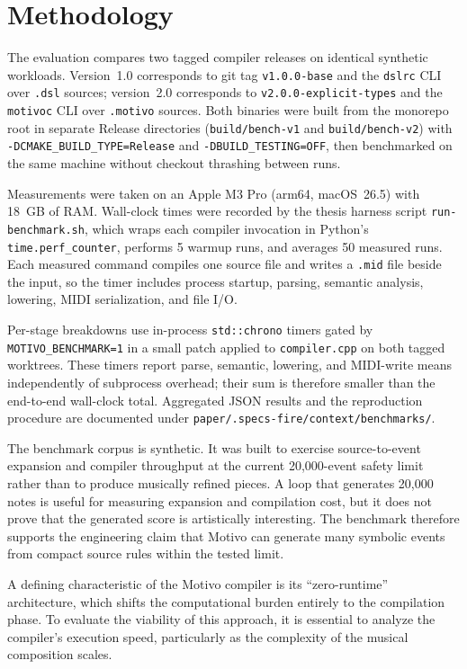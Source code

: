\section{Methodology}\label{sec:evaluation-methodology}

The evaluation compares two tagged compiler releases on identical synthetic workloads.
Version~1.0 corresponds to git tag \texttt{v1.0.0-base} and the \texttt{dslrc} CLI over \texttt{.dsl} sources;
version~2.0 corresponds to \texttt{v2.0.0-explicit-types} and the \texttt{motivoc} CLI over \texttt{.motivo} sources.
Both binaries were built from the monorepo root in separate Release directories
(\texttt{build/bench-v1} and \texttt{build/bench-v2}) with \texttt{-DCMAKE\_BUILD\_TYPE=Release} and
\texttt{-DBUILD\_TESTING=OFF}, then benchmarked on the same machine without checkout thrashing between runs.

Measurements were taken on an Apple M3 Pro (arm64, macOS~26.5) with 18~GB of RAM.
Wall-clock times were recorded by the thesis harness script \texttt{run-benchmark.sh}, which wraps each compiler
invocation in Python's \texttt{time.perf\_counter}, performs 5 warmup runs, and averages 50 measured runs.
Each measured command compiles one source file and writes a \texttt{.mid} file beside the input, so the timer includes
process startup, parsing, semantic analysis, lowering, MIDI serialization, and file I/O.

Per-stage breakdowns use in-process \texttt{std::chrono} timers gated by \texttt{MOTIVO\_BENCHMARK=1} in a small
patch applied to \texttt{compiler.cpp} on both tagged worktrees.
These timers report parse, semantic, lowering, and MIDI-write means independently of subprocess overhead; their sum is
therefore smaller than the end-to-end wall-clock total.
Aggregated JSON results and the reproduction procedure are documented under
\texttt{paper/.specs-fire/context/benchmarks/}.

The benchmark corpus is synthetic.
It was built to exercise source-to-event expansion and compiler throughput at the current 20,000-event safety limit
rather than to produce musically refined pieces.
A loop that generates 20,000 notes is useful for measuring expansion and compilation cost, but it does not prove that
the generated score is artistically interesting.
The benchmark therefore supports the engineering claim that Motivo can generate many symbolic events from compact
source rules within the tested limit.

A defining characteristic of the Motivo compiler is its ``zero-runtime'' architecture, which shifts the computational
burden entirely to the compilation phase.
To evaluate the viability of this approach, it is essential to analyze the compiler's execution speed, particularly as
the complexity of the musical composition scales.

